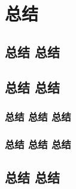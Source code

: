 \chapter{总结}
\section{总结 总结}
\section{总结 总结}
\blindtext
\subsection{总结 总结 总结}
\blindtext
\subsection{总结 总结 总结}
\blindtext
\section{总结 总结}
\blindtext

\endinput